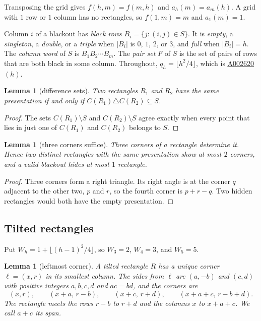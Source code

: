 \documentclass[12pt]{article}
\theoremstyle{plain}
\newtheorem{lemma}[theorem]{Lemma}
\theoremstyle{definition}
\theoremstyle{remark}
\newcommand{\seqnum}[1]{\href{https://oeis.org/#1}{\rm \underline{#1}}}
\begin{document}
Transposing the grid gives $f(h,m)=f(m,h)$ and $a_h(m)=a_m(h)$. A grid with
$1$ row or $1$ column has no rectangles, so $f(1,m)=m$ and $a_1(m)=1$.

Column $i$ of a blackout has \emph{black rows} $B_i=\{j:(i,j)\in S\}$. It is
\emph{empty}, a \emph{singleton}, a \emph{double}, or a \emph{triple} when
$|B_i|$ is $0$, $1$, $2$, or $3$, and \emph{full} when $|B_i|=h$. The \emph{column
word} of $S$ is $B_1B_2\cdots B_m$. The \emph{pair set} $F$ of $S$ is the set of
pairs of rows that are both black in some column. Throughout,
$q_h=\lfloor h^2/4\rfloor$, which is \seqnum{A002620}$(h)$.

\begin{lemma}[difference sets]\label{lem:diff}
Two rectangles $R_1$ and $R_2$ have the same presentation if and only if
$C(R_1)\triangle C(R_2)\subseteq S$.
\end{lemma}

\begin{proof}
The sets $C(R_1)\setminus S$ and $C(R_2)\setminus S$ agree exactly when every
point that lies in just one of $C(R_1)$ and $C(R_2)$ belongs to $S$.
\end{proof}

\begin{lemma}[three corners suffice]\label{lem:threecorners}
Three corners of a rectangle determine it. Hence two distinct rectangles with the
same presentation show at most $2$ corners, and a valid blackout hides at most
$1$ rectangle.
\end{lemma}

\begin{proof}
Three corners form a right triangle. Its right angle is at the corner $q$
adjacent to the other two, $p$ and $r$, so the fourth corner is $p+r-q$. Two
hidden rectangles would both have the empty presentation.
\end{proof}

\subsection{Tilted rectangles}

Put $W_h=1+\lfloor(h-1)^2/4\rfloor$, so $W_3=2$, $W_4=3$, and $W_5=5$.

\begin{lemma}[leftmost corner]\label{lem:leftmost}
A tilted rectangle $R$ has a unique corner $\ell=(x,r)$ in its smallest column.
The sides from $\ell$ are $(a,-b)$ and $(c,d)$ with positive integers $a,b,c,d$
and $ac=bd$, and the corners are
\begin{equation}\label{eq:tilt-param}
(x,r),\qquad(x+a,\,r-b),\qquad(x+c,\,r+d),\qquad(x+a+c,\,r-b+d).
\end{equation}
The rectangle meets the rows $r-b$ to $r+d$ and the columns $x$ to $x+a+c$. We
call $a+c$ its \emph{span}.
\end{lemma}
\end{document}
